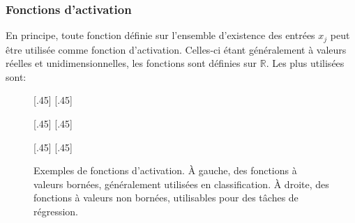 \subsubsection{Fonctions d'activation}\label{chapter-ML-section-DNN-neuron-activ_fct}
En principe, toute fonction définie sur l'ensemble d'existence des entrées $x_j$ peut être utilisée comme fonction d'activation.
Celles-ci étant généralement à valeurs réelles et unidimensionnelles, les fonctions sont définies sur $\mathbb{R}$.
Les plus utilisées sont:
\begin{figure}[p]
\centering

[.45\textwidth]
{\vspace{-\baselineskip}}
\hfill
{}[.45\textwidth]
{\vspace{-\baselineskip}}

\vspace{.5\baselineskip}

[.45\textwidth]
{\vspace{-\baselineskip}}
\hfill
{}[.45\textwidth]
{\vspace{-\baselineskip}}

\vspace{.5\baselineskip}

[.45\textwidth]
{\vspace{-\baselineskip}}
\hfill
{}[.45\textwidth]
{\vspace{-\baselineskip}}

\vspace{.5\baselineskip}

\caption[Exemples de fonctions d'activation.]{Exemples de fonctions d'activation. À gauche, des fonctions à valeurs bornées, généralement utilisées en classification. À droite, des fonctions à valeurs non bornées, utilisables pour des tâches de régression.}
\label{fig-act_fct}
\end{figure}
